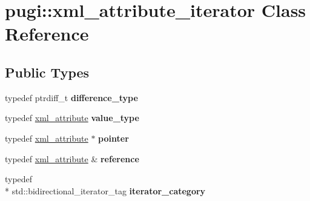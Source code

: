 \hypertarget{classpugi_1_1xml__attribute__iterator}{\section{pugi\-:\-:xml\-\_\-attribute\-\_\-iterator Class Reference}
\label{classpugi_1_1xml__attribute__iterator}
}
\subsection*{Public Types}
\begin{DoxyCompactItemize}
\item 
\hypertarget{classpugi_1_1xml__attribute__iterator_a00b3eecf2aba886a673ad2319be88618}{typedef ptrdiff\-\_\-t {\bfseries difference\-\_\-type}}\label{classpugi_1_1xml__attribute__iterator_a00b3eecf2aba886a673ad2319be88618}

\item 
\hypertarget{classpugi_1_1xml__attribute__iterator_a2b0e779f12de813d7a806056ebed8907}{typedef \hyperlink{classpugi_1_1xml__attribute}{xml\-\_\-attribute} {\bfseries value\-\_\-type}}\label{classpugi_1_1xml__attribute__iterator_a2b0e779f12de813d7a806056ebed8907}

\item 
\hypertarget{classpugi_1_1xml__attribute__iterator_a6ed6fb3197abb02ffa848ad6b9b7a1be}{typedef \hyperlink{classpugi_1_1xml__attribute}{xml\-\_\-attribute} $\ast$ {\bfseries pointer}}\label{classpugi_1_1xml__attribute__iterator_a6ed6fb3197abb02ffa848ad6b9b7a1be}

\item 
\hypertarget{classpugi_1_1xml__attribute__iterator_ade97045a1217d0a7897e5f5873297117}{typedef \hyperlink{classpugi_1_1xml__attribute}{xml\-\_\-attribute} \& {\bfseries reference}}\label{classpugi_1_1xml__attribute__iterator_ade97045a1217d0a7897e5f5873297117}

\item 
\hypertarget{classpugi_1_1xml__attribute__iterator_aad988273a3e4cdc5fa3eb879dbdc8d35}{typedef \\*
std\-::bidirectional\-\_\-iterator\-\_\-tag {\bfseries iterator\-\_\-category}}\label{classpugi_1_1xml__attribute__iterator_aad988273a3e4cdc5fa3eb879dbdc8d35}

\end{DoxyCompactItemize}
